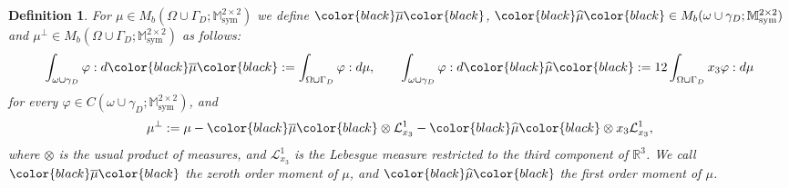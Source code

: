 \documentclass[reqno,10pt]{amsart}
\numberwithin{equation}{section}
\newtheorem{definition}[theorem]{Definition}
\theoremstyle{remark}
\newcommand{\RED}{\color{black}}
\newcommand{\BLACK}{\color{black}}
\newcommand{\PINK}{\color{black}}
\newcommand{\calL}{\mathcal{L}}
\newcommand{\M}{\mathbb{M}}
\newcommand{\R}{\mathbb{R}}
\DeclareMathOperator{\sym}{sym}
\newcommand{\Dir}{D}
\newcommand{\zerothI}[1]{\overline{#1}}
\newcommand{\firstI}[1]{\widehat{#1}}
\begin{document}
\begin{definition} \label{moments of measures}
	For $\mu \in M_b(\Omega \cup \Gamma_\Dir;\M^{2 \times 2}_{\sym})$ we define ${\PINK\zerothI{\mu}\BLACK}$, ${\PINK\firstI{\mu}\BLACK} \in M_b(\omega \cup \gamma_\Dir;\M^{2 \times 2}_{\sym})$ and $\mu^\perp \in M_b(\Omega \cup \Gamma_\Dir;\M^{2 \times 2}_{\sym})$ as follows:
	\begin{equation*}
		\int_{\omega \cup \gamma_\Dir} \varphi: d{\PINK\zerothI{\mu}\BLACK} := \int_{\Omega \cup \Gamma_\Dir} \varphi: d\mu, \qquad
		\int_{\omega \cup \gamma_\Dir} \varphi: d{\PINK\firstI{\mu}\BLACK} := 12\int_{\Omega \cup \Gamma_\Dir} x_3 \varphi: d\mu 
	\end{equation*}
	for every $\varphi \in C(\omega \cup \gamma_\Dir;\M^{2 \times 2}_{\sym})$, and
	\begin{equation*}
		\mu^\perp := \mu - {\PINK\zerothI{\mu}\BLACK} \otimes \calL^{1}_{x_3} - {\PINK\firstI{\mu}\BLACK} \otimes x_3 \calL^{1}_{x_3},
	\end{equation*}
	where $\otimes$ is the usual product of measures, and $\calL^{1}_{x_3}$ is the Lebesgue measure restricted to the third component of $\R^3$. 
	We call ${\PINK\zerothI{\mu}\BLACK}$ the \emph{zeroth order moment} of $\mu${\RED,\BLACK} and ${\PINK\firstI{\mu}\BLACK}$ the \emph{first order moment} of $\mu$.
\end{definition}

\end{document}
